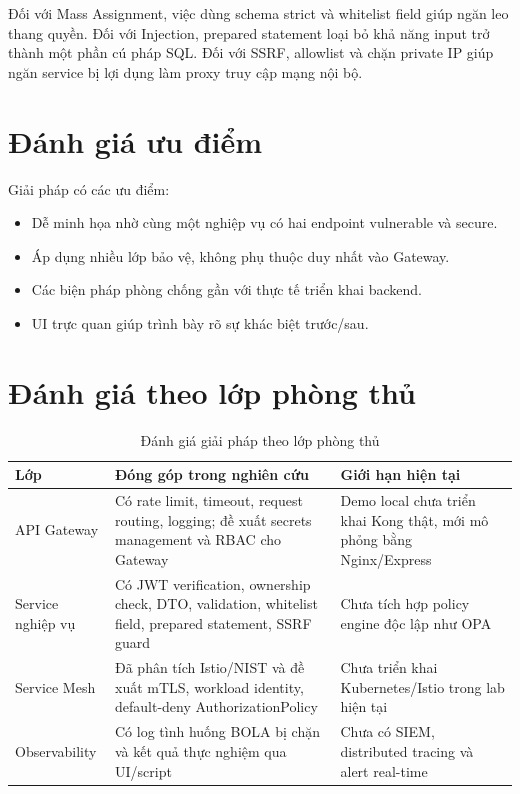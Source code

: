 \documentclass[14pt,a4paper]{extreport}
\begin{document}
Đối với Mass Assignment, việc dùng schema strict và whitelist field giúp ngăn leo thang quyền. Đối với Injection, prepared statement loại bỏ khả năng input trở thành một phần cú pháp SQL. Đối với SSRF, allowlist và chặn private IP giúp ngăn service bị lợi dụng làm proxy truy cập mạng nội bộ.

\section{Đánh giá ưu điểm}
Giải pháp có các ưu điểm:
\begin{itemize}
  \item Dễ minh họa nhờ cùng một nghiệp vụ có hai endpoint vulnerable và secure.
  \item Áp dụng nhiều lớp bảo vệ, không phụ thuộc duy nhất vào Gateway.
  \item Các biện pháp phòng chống gần với thực tế triển khai backend.
  \item UI trực quan giúp trình bày rõ sự khác biệt trước/sau.
\end{itemize}

\section{Đánh giá theo lớp phòng thủ}
\begin{longtable}{p{3.2cm}p{4.8cm}p{5.4cm}}
\caption{Đánh giá giải pháp theo lớp phòng thủ}\\
\toprule
\textbf{Lớp} & \textbf{Đóng góp trong nghiên cứu} & \textbf{Giới hạn hiện tại}\\
\midrule
API Gateway & Có rate limit, timeout, request routing, logging; đề xuất secrets management và RBAC cho Gateway & Demo local chưa triển khai Kong thật, mới mô phỏng bằng Nginx/Express\\
Service nghiệp vụ & Có JWT verification, ownership check, DTO, validation, whitelist field, prepared statement, SSRF guard & Chưa tích hợp policy engine độc lập như OPA\\
Service Mesh & Đã phân tích Istio/NIST và đề xuất mTLS, workload identity, default-deny AuthorizationPolicy & Chưa triển khai Kubernetes/Istio trong lab hiện tại\\
Observability & Có log tình huống BOLA bị chặn và kết quả thực nghiệm qua UI/script & Chưa có SIEM, distributed tracing và alert real-time\\
\bottomrule
\end{longtable}
\end{document}
